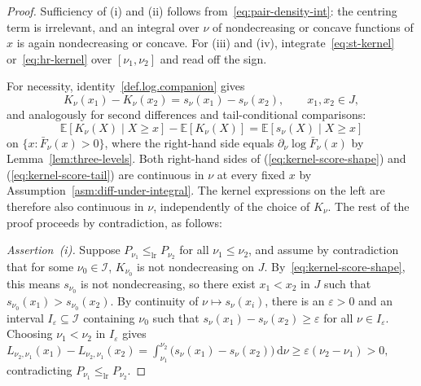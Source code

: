 \documentclass[10pt,a4paper]{amsart}
\newcommand{\E}{\mathbb{E}}
\newcommand{\dx}[1][x]{%
	\ensuremath{
		{\mathrm{d}}{#1}
	}
}
\newcommand{\lr}{\le_{\mathrm{lr}}}
\begin{document}
\begin{proof}
Sufficiency of \textup{(i)} and \textup{(ii)} follows from~\eqref{eq:pair-density-int}: the centring term is irrelevant, and an integral over \(\nu\) of nondecreasing or concave functions of \(x\) is again nondecreasing or concave. For \textup{(iii)} and \textup{(iv)}, integrate~\eqref{eq:st-kernel} or~\eqref{eq:hr-kernel} over $[\nu_1,\nu_2]$ and read off the sign.

For necessity,  identity~\eqref{def.log.companion} gives
\begin{equation}
\label{eq:kernel-score-shape}
K_\nu(x_1)-K_\nu(x_2)=s_\nu(x_1)-s_\nu(x_2),\qquad x_1,x_2\in J,
\end{equation}
and analogously for second differences and tail-conditional comparisons:
\begin{equation}
\label{eq:kernel-score-tail}
\E[K_\nu(X)\mid X\ge x]-\E[K_\nu(X)] =\E[s_\nu(X)\mid X\ge x]
\end{equation}
on \(\{x:\bar F_\nu(x)>0\}\), where the right-hand side equals \(\partial_\nu\log\bar F_\nu(x)\) by Lemma~\ref{lem:three-levels}. Both right-hand sides of (\ref{eq:kernel-score-shape}) and (\ref{eq:kernel-score-tail}) are continuous in \(\nu\) at every fixed \(x\) by Assumption~\ref{asm:diff-under-integral}. The kernel expressions on the left are therefore also continuous in \(\nu\), independently of the choice of $K_\nu$. The rest of the proof proceeds by contradiction, as follows:

\emph{Assertion~\textup{(i)}.} Suppose \(P_{\nu_1}\lr P_{\nu_2}\) for all \(\nu_1\le\nu_2\), and assume by contradiction that for some \(\nu_0 \in \mathcal I\), \(K_{\nu_0}\) is not nondecreasing on \(J\). By~\eqref{eq:kernel-score-shape}, this means $s_{\nu_0}$ is not nondecreasing, so there exist \(x_1<x_2\) in \(J\) such that \(s_{\nu_0}(x_1)>s_{\nu_0}(x_2)\). By continuity of $\nu\mapsto s_\nu(x_i)$, there is an \(\varepsilon>0\) and an interval $I_\varepsilon\subseteq\mathcal I$ containing $\nu_0$ such that $s_\nu(x_1)-s_\nu(x_2)\ge\varepsilon$ for all $\nu\in I_\varepsilon$. Choosing \(\nu_1<\nu_2\) in \(I_\varepsilon\) gives $L_{\nu_2,\nu_1}(x_1)-L_{\nu_2,\nu_1}(x_2)
=\int_{\nu_1}^{\nu_2}\bigl(s_\nu(x_1)-s_\nu(x_2)\bigr)\,\dx[\nu]
\ge \varepsilon(\nu_2-\nu_1)>0,
$
contradicting \(P_{\nu_1}\lr P_{\nu_2}\).


\end{proof}
\end{document}
